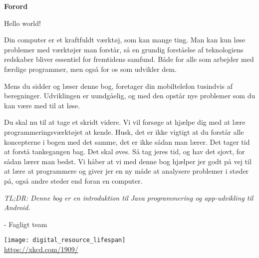 \cleardoublepage
\begin{titlepage}
	{\centering
	\vspace{3cm}
	{\Huge\sffamily\bfseries Forord \par} \vspace{0.5cm}}


	\noindent
	{\Large\ttfamily Hello world! \par}
	
	Din computer er et kraftfuldt værktøj, som kan mange ting. Man kan kun løse problemer med værktøjer man forstår, så en grundig forståelse af teknologiens redskaber bliver essentiel for fremtidens samfund. Både for alle som arbejder med færdige programmer, men også for os som udvikler dem. 
	
	Mens du sidder og læser denne bog, foretager din mobiltelefon tusindvis af beregninger. Udviklingen er uundgåelig, og med den opstår nye problemer som du kan være med til at løse. 
	
	Du skal nu til at tage et skridt videre. Vi vil forsøge at hjælpe dig med at lære programmeringsværktøjet at kende.
	Husk, det er ikke vigtigt at du forstår alle koncepterne i bogen med det samme, det er ikke sådan man lærer.
	Det tager tid at forstå tankegangen bag. Det skal øves.
	Så tag jeres tid, og hav det sjovt, for sådan lærer man bedst.
	Vi håber at vi med denne bog hjælper jer godt på vej til at lære at programmere og giver jer en ny måde at analysere problemer i støder på, også andre steder end foran en computer.
	
	{\small \itshape TL;DR: Denne bog er en introduktion til Java programmering og app-udvikling til Android.}
	
	{
	{\small - Fagligt team \par}}
	
	\vfill
	
	{\centering
	{\texttt{[image: digital\_resource\_lifespan]}\\
		\tiny \url{https://xkcd.com/1909/} \par}}
\end{titlepage}
